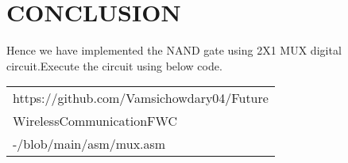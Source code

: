 \documentclass[journal,12pt,twocolumn]{IEEEtran}
\begin{document}
\section{CONCLUSION}

Hence we have implemented the NAND gate using 2X1 MUX digital circuit.Execute the circuit using below code.
   \begin{tabularx}{0.46\textwidth} { 
  | >{\centering\arraybackslash}X |}
  \hline
   https://github.com/Vamsichowdary04/Future\\\-Wireless\-Communication\-FWC\\-/blob/main/asm/mux.asm\\
  \hline
\end{tabularx}

\end{document}
